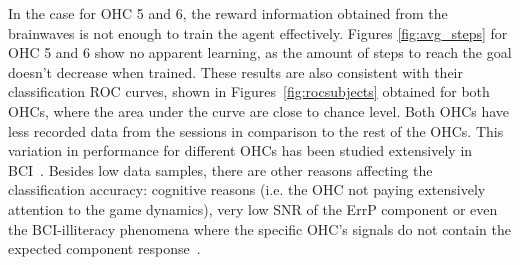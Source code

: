 \documentclass[journal]{IEEEtran}
\begin{document}
{{In the case for OHC 5 and 6, the reward information obtained from the brainwaves is not enough to train the agent effectively. Figures \ref{fig:avg_steps} for OHC 5 and 6 show no apparent learning, as the amount of steps to reach the goal doesn't decrease when trained.  These results are also consistent with their classification ROC curves, shown in Figures~\ref{fig:rocsubjects} obtained for both OHCs, where the area under the curve are close to chance level.  Both OHCs have less recorded data from the sessions in comparison to the rest of the OHCs.  This variation in performance for different OHCs has been studied extensively in BCI~\cite{Chavarriaga2014}.  Besides low data samples, there are other reasons affecting the classification accuracy:  cognitive reasons (i.e. the OHC not paying extensively attention to the game dynamics), very low SNR of the ErrP component or even the BCI-illiteracy phenomena where the specific OHC's signals do not contain the expected component response~\cite{Yousefi2019}.

}}
\end{document}
